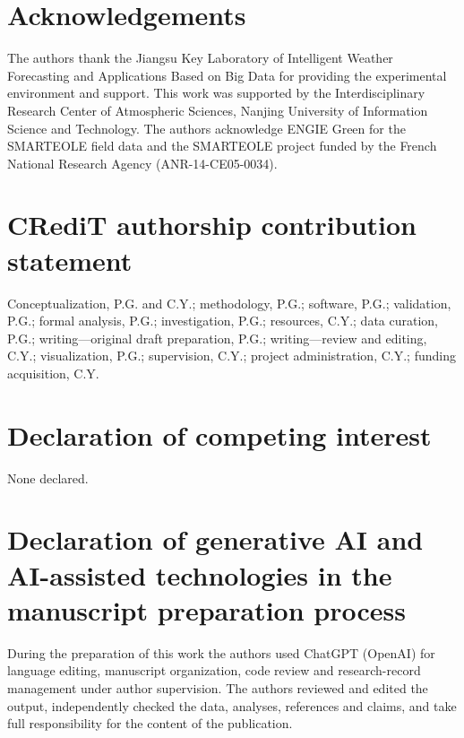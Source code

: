 \documentclass[preprint,12pt]{elsarticle}
\begin{document}
\section*{Acknowledgements}
The authors thank the Jiangsu Key Laboratory of Intelligent Weather Forecasting and Applications Based on Big Data for providing the experimental environment and support. This work was supported by the Interdisciplinary Research Center of Atmospheric Sciences, Nanjing University of Information Science and Technology. The authors acknowledge ENGIE Green for the SMARTEOLE field data and the SMARTEOLE project funded by the French National Research Agency (ANR-14-CE05-0034).

\section*{CRediT authorship contribution statement}
Conceptualization, P.G. and C.Y.; methodology, P.G.; software, P.G.; validation, P.G.; formal analysis, P.G.; investigation, P.G.; resources, C.Y.; data curation, P.G.; writing—original draft preparation, P.G.; writing—review and editing, C.Y.; visualization, P.G.; supervision, C.Y.; project administration, C.Y.; funding acquisition, C.Y.

\section*{Declaration of competing interest}
None declared.

\section{Declaration of generative AI and AI-assisted technologies in the manuscript preparation process}\label{declaration-of-generative-ai-and-ai-assisted-technologies-in-the-manuscript-preparation-process}

During the preparation of this work the authors used ChatGPT (OpenAI) for language editing, manuscript organization, code review and research-record management under author supervision. The authors reviewed and edited the output, independently checked the data, analyses, references and claims, and take full responsibility for the content of the publication.



\end{document}

